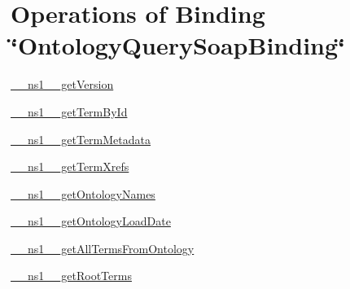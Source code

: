 \hypertarget{OntologyQuerySoapBinding_OntologyQuerySoapBinding_operations}{}\section{Operations of Binding  \char`\"{}OntologyQuerySoapBinding\char`\"{}}\label{OntologyQuerySoapBinding_OntologyQuerySoapBinding_operations}

\begin{DoxyItemize}
\item \hyperlink{struct____ns1____getVersion}{\_\-\_\-ns1\_\-\_\-getVersion}
\end{DoxyItemize}


\begin{DoxyItemize}
\item \hyperlink{struct____ns1____getTermById}{\_\-\_\-ns1\_\-\_\-getTermById}
\end{DoxyItemize}


\begin{DoxyItemize}
\item \hyperlink{struct____ns1____getTermMetadata}{\_\-\_\-ns1\_\-\_\-getTermMetadata}
\end{DoxyItemize}


\begin{DoxyItemize}
\item \hyperlink{struct____ns1____getTermXrefs}{\_\-\_\-ns1\_\-\_\-getTermXrefs}
\end{DoxyItemize}


\begin{DoxyItemize}
\item \hyperlink{struct____ns1____getOntologyNames}{\_\-\_\-ns1\_\-\_\-getOntologyNames}
\end{DoxyItemize}


\begin{DoxyItemize}
\item \hyperlink{struct____ns1____getOntologyLoadDate}{\_\-\_\-ns1\_\-\_\-getOntologyLoadDate}
\end{DoxyItemize}


\begin{DoxyItemize}
\item \hyperlink{struct____ns1____getAllTermsFromOntology}{\_\-\_\-ns1\_\-\_\-getAllTermsFromOntology}
\end{DoxyItemize}


\begin{DoxyItemize}
\item \hyperlink{struct____ns1____getRootTerms}{\_\-\_\-ns1\_\-\_\-getRootTerms}
\end{DoxyItemize}


